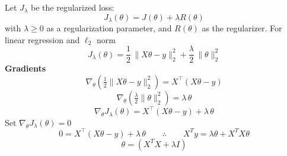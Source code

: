 \begin{answer}

Let $J_{\lambda}$ be the regularized loss:
$$
J_{\lambda}(\theta) = J(\theta) + \lambda R(\theta)
$$
with $\lambda \geq 0$ as a regularization parameter, and $R(\theta)$ as the regularizer. For linear regression and $\ell_{2}$ norm
$$
J_\lambda(\theta)
= \frac{1}{2}\,\|X\theta - y\|_2^2
+ \frac{\lambda}{2}\,\|\theta\|_2^2
$$
\textbf{Gradients}
$$\nabla_\theta \left(\tfrac{1}{2}\|X\theta - y\|_2^2\right) = X^\top(X\theta - y)$$
$$\nabla_\theta \left(\tfrac{\lambda}{2}\|\theta\|_2^2\right) = \lambda\,\theta$$
$$
\nabla_\theta J_{\lambda}(\theta) = X^\top(X\theta - y) +  \lambda\,\theta
$$
Set $\nabla_\theta J_{\lambda}(\theta)  = 0$
$$
0= X^\top(X\theta - y) +  \lambda\,\theta \qquad \therefore \qquad X^{T}y = \lambda \theta + X^{T}X\theta
$$
$$
\boxed{ \theta = (X^{T}X + \lambda I) }
$$
\end{answer}

